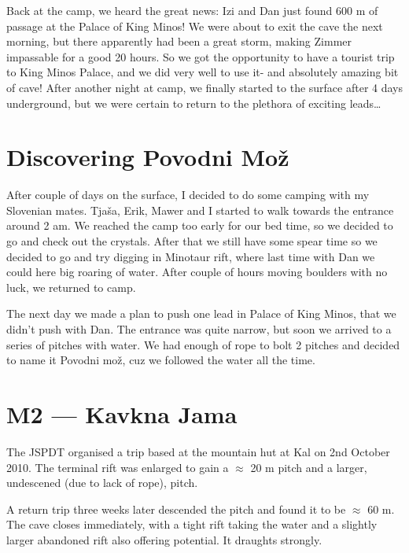 Back at the camp, we heard the great news: Izi and Dan just found 600 m
of passage at the Palace of King Minos! We were about to exit the cave
the next morning, but there apparently had been a great storm, making
Zimmer impassable for a good 20 hours. So we got the opportunity to have
a tourist trip to King Minos Palace, and we did very well to use it- and
absolutely amazing bit of cave! After another night at camp, we finally
started to the surface after 4 days underground, but we were certain to
return to the plethora of exciting leads\ldots{}


\hypertarget{discovering-povodni-moux17e}{%
\section{Discovering Povodni Mož}\label{discovering-povodni-moux17e}}

After couple of days on the surface, I decided to do some camping with
my Slovenian mates. Tjaša, Erik, Mawer and I started to walk towards the
entrance around 2 am. We reached the camp too early for our bed time, so
we decided to go and check out the crystals. After that we still have
some spear time so we decided to go and try digging in Minotaur rift,
where last time with Dan we could here big roaring of water. After
couple of hours moving boulders with no luck, we returned to camp.

The next day we made a plan to push one lead in Palace of King Minos,
that we didn't push with Dan. The entrance was quite narrow, but soon we
arrived to a series of pitches with water. We had enough of rope to bolt
2 pitches and decided to name it Povodni mož, cuz we followed the water
all the time.

\attrib{\izi}

\hypertarget{m2-kavkna-jama}{%
\section{M2 --- Kavkna Jama}\label{m2-kavkna-jama}}

The JSPDT organised a trip based at the mountain hut at Kal on 2nd
October 2010. The terminal rift was enlarged to gain a \(\approx\) 20 m
pitch and a larger, undescened (due to lack of rope), pitch.

A return trip three weeks later descended the pitch and found it to be
\(\approx\) 60 m. The cave closes immediately, with a tight rift taking
the water and a slightly larger abandoned rift also offering potential.
It draughts strongly.

